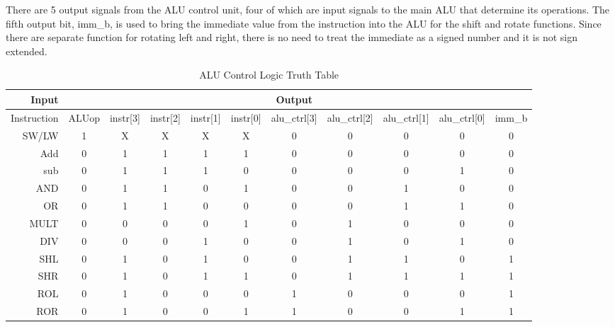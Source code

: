 	There are 5 output signals from the ALU control unit, four of which 
	are input signals to the main ALU that determine its operations. The fifth output bit, imm\_b, is used to bring the immediate value from the instruction into the ALU for the shift and rotate functions. Since there are separate function for rotating left and right, there is no need to treat the immediate as a signed number and it is not sign extended.
	
    \begin{table}[htbp]
        \caption{ALU Control Logic Truth Table}
        \label{alucontrol}
        \centering
        \begin{tabular}{r | c c c c c | c c c c c}
        Input & & & & & & Output & & & & \\
        \hline
        Instruction & ALUop & instr[3] & instr[2] & instr[1] & instr[0] & alu\_ctrl[3] & alu\_ctrl[2] & alu\_ctrl[1] & alu\_ctrl[0] & imm\_b\\
        SW/LW       & 1     & X        & X        & X        & X        & 0            & 0            & 0            & 0            & 0\\
        Add         & 0     & 1        & 1        & 1        & 1        & 0            & 0            & 0            & 0            & 0\\
        sub         & 0     & 1        & 1        & 1        & 0        & 0            & 0            & 0            & 1            & 0\\
        AND         & 0     & 1        & 1        & 0        & 1        & 0            & 0            & 1            & 0            & 0\\
        OR          & 0     & 1        & 1        & 0        & 0        & 0            & 0            & 1            & 1            & 0\\
        MULT        & 0     & 0        & 0        & 0        & 1        & 0            & 1            & 0            & 0            & 0\\
        DIV         & 0     & 0        & 0        & 1        & 0        & 0            & 1            & 0            & 1            & 0\\
        SHL         & 0     & 1        & 0        & 1        & 0        & 0            & 1            & 1            & 0            & 1\\
        SHR         & 0     & 1        & 0        & 1        & 1        & 0            & 1            & 1            & 1            & 1\\
        ROL         & 0     & 1        & 0        & 0        & 0        & 1            & 0            & 0            & 0            & 1\\
        ROR         & 0     & 1        & 0        & 0        & 1        & 1            & 0            & 0            & 1            & 1\\
        \end{tabular}
    \end{table}


